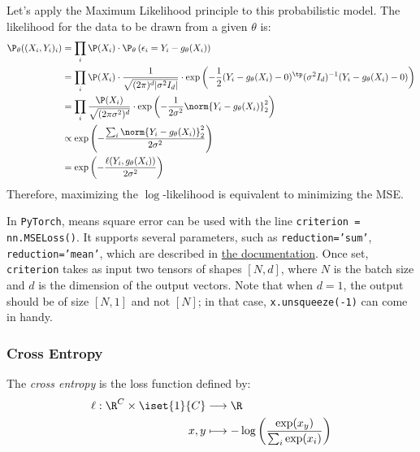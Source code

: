 Let's apply the Maximum Likelihood principle to this probabilistic model. The likelihood for the data to be drawn from a given $\theta$ is:
\begin{equation*}
    \begin{aligned}
        \P_\theta((X_i,Y_i)_i)&=\prod_i \P(X_i) \cdot \P_\theta\left(\epsilon_i=Y_i-g_\theta(X_i)\right)\\
        &=\prod_i \P(X_i) \cdot \frac{1}{\sqrt{(2\pi)^d|\sigma^2I_d|}}\cdot\exp\left(-\frac{1}{2}(Y_i-g_\theta(X_i)-0)^\tp(\sigma^2I_d)^{-1}(Y_i-g_\theta(X_i)-0)\right) \\
        &=\prod_i \frac{\P(X_i)}{\sqrt{(2\pi\sigma^2)^d}}\cdot\exp\left(-\frac{1}{2\sigma^2}\norm{Y_i-g_\theta(X_i)}_2^2\right) \\
        &\propto\exp\left(-\frac{\sum_i\norm{Y_i-g_\theta(X_i)}_2^2}{2\sigma^2}\right)\\
        &= \exp\left(-\frac{\ell(Y_i,g_\theta(X_i))}{2\sigma^2}\right)
    \end{aligned}
\end{equation*}
Therefore, maximizing the $\log$-likelihood is equivalent to minimizing the MSE.

In \texttt{PyTorch}, means square error can be used with the line \texttt{criterion = nn.MSELoss()}. It supports several parameters, such as \texttt{reduction='sum'}, \texttt{reduction='mean'}, which are described in \href{https://pytorch.org/docs/stable/generated/torch.nn.MSELoss.html}{the documentation}. Once set, \texttt{criterion} takes as input two tensors of shapes $[N,d]$, where $N$ is the batch size and $d$ is the dimension of the output vectors. Note that when $d=1$, the output should be of size $[N,1]$ and not $[N]$; in that case, \texttt{x.unsqueeze(-1)} can come in handy.

\subsubsection{Cross Entropy}
\begin{definition}
    The \emph{cross entropy} is the loss function defined by:
    \begin{equation*}
        \begin{aligned}
            \ell : \R^C\times\iset{1}{C}&\longrightarrow\R\\
            x, y&\longmapsto -\log\left(\frac{\exp(x_y)}{\sum_i\exp(x_i)}\right)
        \end{aligned}
    \end{equation*}
\end{definition}

